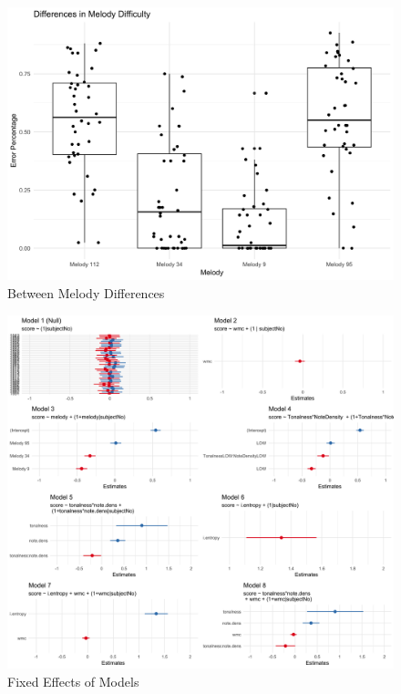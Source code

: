 \documentclass[12pt,]{book}
\begin{document}
\begin{figure}

{\centering \includegraphics[width=1\linewidth]{img/melody_differences} 

}

\caption{Between Melody Differences}\label{fig:edistribution}
\end{figure}

\begin{figure}

{\centering \includegraphics[width=1\linewidth]{img/me_grid} 

}

\caption{Fixed Effects of Models}\label{fig:megrid}
\end{figure}
\end{document}
